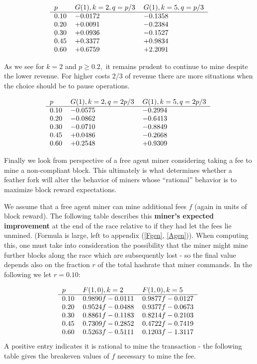 \documentclass{article}%
\begin{document}
\begin{equation} \begin{tabular}[c]{lll} $p$ & $G(1),k=2,q=p/3$ & $G(1),k=5,q=p/3$\\ \hline $0.10$ & $-0.0172$ & $-0.1358$\\ $0.20$ & $+0.0091$ & $-0.2384$\\ $0.30$ & $+0.0936$ & $-0.1527$\\ $0.45$ & $+0.3377$ & $+0.9834$\\ $0.60$ & $+0.6759$ & $+2.2091$ \end{tabular} \label{t4} \end{equation}



As we see for $k=2$ and $p\geq0.2,$ it remains prudent to continue to mine
despite the lower revenue.  For higher costs 2/3 of revenue there are more
situations when the choice should be to pause operations.%

\[%
\begin{tabular}[c]{lll} $p$ & $G(1),k=2,q=2p/3$ & $G(1),k=5,q=2p/3$\\ \hline $0.10$ & $-0.0575$ & $-0.2994$\\ $0.20$ & $-0.0862$ & $-0.6413$\\ $0.30$ & $-0.0710$ & $-0.8849$\\ $0.45$ & $+0.0486$ & $-0.2668$\\ $0.60$ & $+0.2548$ & $+0.9309$ \end{tabular}
\
\]


Finally we look from perspective of a free agent miner considering taking a
fee to mine a non-compliant block.  This ultimately is what determines
whether a feather fork will alter the behavior of miners whose
\textquotedblleft rational'' behavior is to maximize block reward expectations.

We assume that a free agent miner can mine additional fees $f$ (again in units
of block reward).  The following table describes this \textbf{miner's expected
improvement} at the end of the race relative to if they had let the fees lie
unmined.  (Formula is large, left to appendix (\ref{Fgen}, \ref{Agen})).  %
When computing this, one must take into consideration the possibility that the miner might mine further blocks along the race which are subsequently lost - so the final value depends also on the fraction $r$ of the total hashrate that miner commands.   In the following we let $r=0.10$:

\[%
\begin{tabular}[c]{lll} $p$ & $F(1,0),k=2$ & $F(1,0),k=5$\\ \hline $0.10$ & $0.9890f-0.0111$ & $0.9877f-0.0127$\\ $0.20$ & $0.9524f-0.0488$ & $0.9377f-0.0673$\\ $0.30$ & $0.8861f-0.1183$ & $0.8214f-0.2103$\\ $0.45$ & $0.7309f-0.2852$ & $0.4722f-0.7419$\\ $0.60$ & $0.5263f-0.5111$ & $0.1203f-1.3117$ \end{tabular}
\
\]
A positive entry indicates it is rational to mine the transaction - the
following table gives the breakeven values of $f$ necessary to mine the fee.
\end{document}
